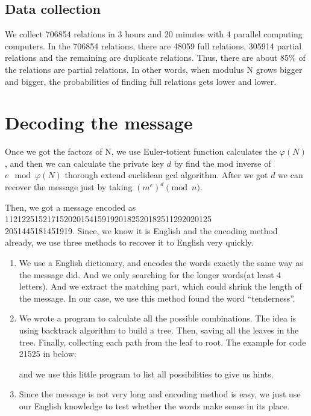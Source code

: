 \documentclass[12pt]{article} %
\begin{document}
	\subsection{Data collection}
	We collect 706854 relations in 3 hours and 20 minutes with 4 parallel computing computers. In the 706854 relations, there are 48059 full relations, 305914 partial relations and the remaining are duplicate relations.
	Thus, there are about 85$\%$ of the relations are partial relations. In other words, when modulus N grows bigger and bigger, the probabilities of finding full relations gets lower and lower.
	
	\section {Decoding the message}
	
	Once we got the factors of N, we use Euler-totient function calculates the $\varphi(N)$, and then we can calculate the private key $d$ by find the mod inverse of $e \mod{\varphi(N)}$ thorough extend euclidean gcd algorithm. After we got $d$ we can recover the message just by taking $(m^e)^d \pmod{n}$. 
	
	Then, we got a message encoded as 1121225152171520201541591920182520182511292020125\\2051445181451919. Since, we know it is English and the encoding method already, we use three methods to recover it to English very quickly. 
	
	\renewcommand\labelenumi{\arabic{enumi}.}
	\begin{enumerate}
		\item We use a English dictionary, and encodes the words exactly the same way as the message did. And we only searching for the longer words(at least 4 letters). And we extract the matching part, which could shrink the length of the message. In our case, we use this method found the word ``tenderness''.
		
		\item We wrote a program to calculate all the possible combinations. The idea is using backtrack algorithm to build a tree. Then, saving all the leaves in the tree. Finally, collecting each path from the leaf to root. The example for code 21525 in below: 
		
		\pagebreak
		
		
		and we use this little program to list all possibilities to give us hints.
		
		\item Since the message is not very long and encoding method is easy, we just use our English knowledge to test whether the words make sense in its place.
		
	\end{enumerate}
	
\end{document}

